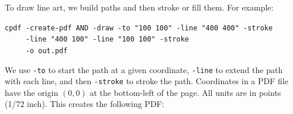 \documentclass{book}
\begin{document}
\noindent  To draw line art, we build paths and then stroke or fill them. For example:

\begin{framed}
 \noindent\small\verb?cpdf -create-pdf AND -draw -to "100 100" -line "400 400" -stroke?\\
 \noindent\small\verb?     -line "400 100" -line "100 100" -stroke?\\
 \noindent\small\verb?     -o out.pdf?
\end{framed}

\noindent We use \texttt{-to} to start the path at a given coordinate, \texttt{-line} to extend the path with each line, and then \texttt{-stroke} to stroke the path. Coordinates in a PDF file have the origin $(0, 0)$ at the bottom-left of the page. All units are in points (1/72 inch). This creates the following PDF:
\end{document}
